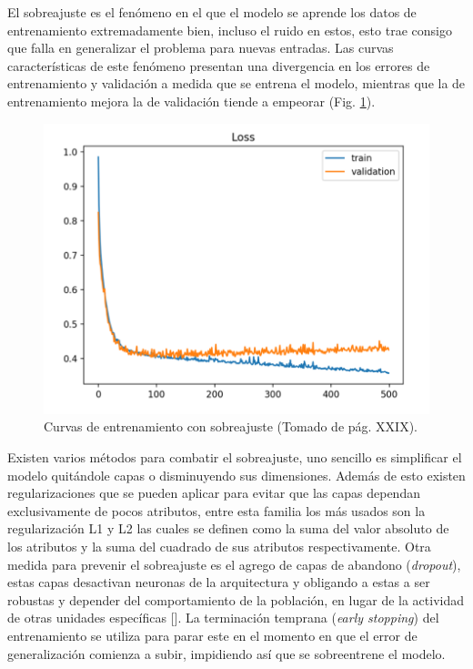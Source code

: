 El sobreajuste es el fenómeno en el que el modelo se aprende los datos de entrenamiento extremadamente bien, incluso
el ruido en estos, esto trae consigo que falla en generalizar el problema para nuevas entradas. Las curvas 
características de este fenómeno presentan una divergencia en los errores de entrenamiento y validación a medida
que se entrena el modelo, mientras que la de entrenamiento mejora la de validación tiende a empeorar (Fig. \ref{fig:overfit}). 

\begin{figure}[h!]
	\begin{center}
		\begin{center}
			\includegraphics[scale=.3]{Graphics/overfit_raising_val_error.png}
        \end{center}
	    \caption{Curvas de entrenamiento con sobreajuste (Tomado de \cite{brownlee2018better} pág. XXIX).}\label{fig:overfit}
	\end{center}
\end{figure}

Existen varios métodos para combatir el sobreajuste, uno sencillo es simplificar el modelo quitándole capas 
o disminuyendo sus dimensiones. Además de esto existen regularizaciones que se pueden aplicar para evitar que 
las capas dependan exclusivamente de pocos atributos, entre esta familia los más usados son la regularización
L1 y L2 las cuales se definen como la suma del valor absoluto de los atributos y la suma del cuadrado de sus 
atributos respectivamente. Otra medida para prevenir el sobreajuste es el agrego de capas de abandono 
(\emph{dropout}), estas capas desactivan neuronas de la arquitectura y obligando a 
estas a ser robustas y depender del comportamiento de la población, en lugar de la actividad de otras unidades 
específicas [\cite{baldi2013dropout}]. La terminación temprana (\emph{early stopping}) del entrenamiento
se utiliza para parar este en el momento en que el error de generalización comienza a subir, impidiendo así que 
se sobreentrene el modelo.

